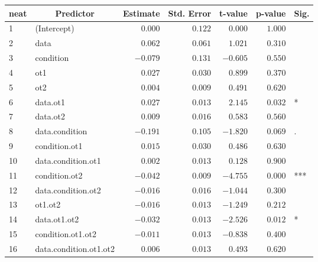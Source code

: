 \begin{table}[!tbp]
\begin{center}
\begin{tabular}{llrrrrl}
\hline\hline
\multicolumn{1}{l}{neat}&\multicolumn{1}{c}{Predictor}&\multicolumn{1}{c}{Estimate}&\multicolumn{1}{c}{Std. Error}&\multicolumn{1}{c}{t-value}&\multicolumn{1}{c}{p-value}&\multicolumn{1}{c}{Sig.}\tabularnewline
\hline
1&(Intercept)&$ 0.000$&$0.122$&$ 0.000$&$1.000$& \tabularnewline
2&data&$ 0.062$&$0.061$&$ 1.021$&$0.310$& \tabularnewline
3&condition&$-0.079$&$0.131$&$-0.605$&$0.550$& \tabularnewline
4&ot1&$ 0.027$&$0.030$&$ 0.899$&$0.370$& \tabularnewline
5&ot2&$ 0.004$&$0.009$&$ 0.491$&$0.620$& \tabularnewline
6&data.ot1&$ 0.027$&$0.013$&$ 2.145$&$0.032$&*\tabularnewline
7&data.ot2&$ 0.009$&$0.016$&$ 0.583$&$0.560$& \tabularnewline
8&data.condition&$-0.191$&$0.105$&$-1.820$&$0.069$&.\tabularnewline
9&condition.ot1&$ 0.015$&$0.030$&$ 0.486$&$0.630$& \tabularnewline
10&data.condition.ot1&$ 0.002$&$0.013$&$ 0.128$&$0.900$& \tabularnewline
11&condition.ot2&$-0.042$&$0.009$&$-4.755$&$0.000$&***\tabularnewline
12&data.condition.ot2&$-0.016$&$0.016$&$-1.044$&$0.300$& \tabularnewline
13&ot1.ot2&$-0.016$&$0.013$&$-1.249$&$0.212$& \tabularnewline
14&data.ot1.ot2&$-0.032$&$0.013$&$-2.526$&$0.012$&*\tabularnewline
15&condition.ot1.ot2&$-0.011$&$0.013$&$-0.838$&$0.400$& \tabularnewline
16&data.condition.ot1.ot2&$ 0.006$&$0.013$&$ 0.493$&$0.620$& \tabularnewline
\hline
\end{tabular}\end{center}
\end{table}
